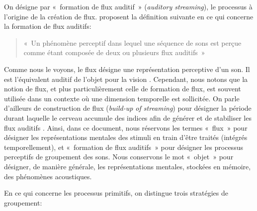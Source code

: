 On désigne par «~formation de flux auditif~» (\emph{auditory streaming}), le processus à l'origine de la création de flux. \citep{winkler2009modeling} proposent la définition suivante en ce qui concerne la formation de flux auditifs:

\begin{quote}
«~Un phénomène perceptif dans lequel une séquence de sons est perçue comme étant composée de deux ou plusieurs flux auditifs~»
\end{quote}

Comme nous le voyons, le flux désigne une représentation perceptive d'un son. Il est l'équivalent auditif de l'objet pour la vision \citep[p. 11]{bregman1994auditory}. Cependant, nous notons que la notion de flux, et plus particulièrement celle de formation de flux, est souvent utilisée dans un contexte où une dimension temporelle est sollicitée. On parle d'ailleurs de construction de flux (\emph{build-up of streaming}) pour désigner la période durant laquelle le cerveau accumule des indices afin de générer et de stabiliser les flux auditifs \citep{cusack2004effects,snyder2007toward}. Ainsi, dans ce document, nous réservons les termes «~flux~» pour désigner les représentations mentales des stimuli en train d'être traités (intégrés temporellement), et «~formation de flux auditifs~» pour désigner les processus perceptifs de groupement des sons. Nous conservons le mot «~objet~» pour désigner, de manière générale, les représentations mentales, stockées en mémoire, des phénomènes acoustiques.

En ce qui concerne les processus primitifs, on distingue trois stratégies de groupement:

